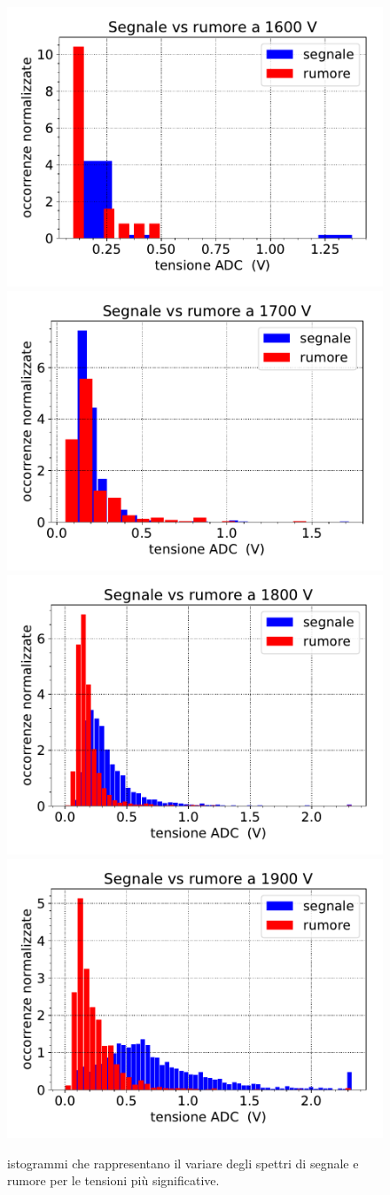 \begin{figure}[h]
\subfloat
{\includegraphics[width=8 cm]{1600}}
\qquad
\subfloat
{\includegraphics[width=8 cm]{1700}} 
\\
\subfloat
{\includegraphics[width=8 cm]{1800}}
\qquad
\subfloat
{\includegraphics[width=8 cm]{1900}}
\caption{istogrammi che rappresentano il variare degli spettri di segnale e rumore per le tensioni più significative.}
\label{quattro}
\end{figure}

